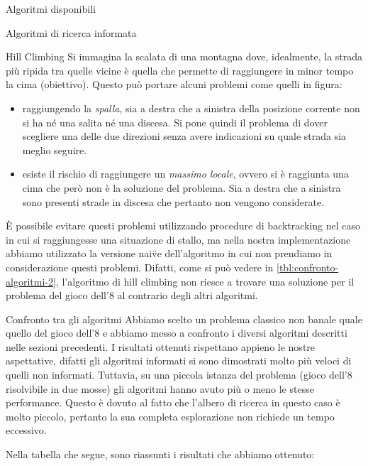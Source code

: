 \begin{chapter}{Algoritmi disponibili}
\begin{section}{Algoritmi di ricerca informata}
\begin{subsection}{Hill Climbing}
    Si immagina la scalata di una montagna dove, idealmente, la strada pi\`u ripida tra quelle vicine
    \`e quella che permette di raggiungere in minor tempo la cima (obiettivo). Questo pu\`o portare
    alcuni problemi come quelli in figura:
    \begin{itemize}
        \item raggiungendo la \textit{spalla}, sia a destra che a sinistra della posizione corrente
        non si ha n\'e una salita n\'e una discesa. Si pone quindi il problema di dover scegliere
        una delle due direzioni senza avere indicazioni su quale strada sia meglio seguire.
        \item esiste il rischio di raggiungere un \textit{massimo locale}, ovvero si \`e raggiunta
        una cima che per\`o non \`e la soluzione del problema. Sia a destra che a sinistra sono
        presenti strade in discesa che pertanto non vengono considerate.
    \end{itemize}

    \`E possibile evitare questi problemi utilizzando procedure di backtracking nel caso in cui si
    raggiungesse una situazione di stallo, ma nella nostra implementazione abbiamo utilizzato la
    versione nai\"ve dell'algoritmo in cui non prendiamo in considerazione questi problemi. Difatti,
    come si pu\`o vedere in \ref{tbl:confronto-algoritmi-2}, l'algoritmo di hill climbing non
    riesce a trovare una soluzione per il problema del gioco dell'8 al contrario degli altri
    algoritmi.
    \end{subsection}
\end{section}

\begin{section}{Confronto tra gli algoritmi}
Abbiamo scelto un problema classico non banale quale quello del gioco dell'8
e abbiamo messo a confronto i diversi algoritmi descritti nelle sezioni
precedenti. I risultati ottenuti rispettano appieno le nostre aspettative,
difatti gli algoritmi informati si sono dimostrati molto pi\`u veloci di
quelli non informati. Tuttavia, su una piccola istanza del problema (gioco
dell'8 risolvibile in due mosse) gli algoritmi hanno avuto pi\`u o meno
le stesse performance. Questo \`e dovuto al fatto che l'albero di ricerca
in questo caso \`e molto piccolo, pertanto la sua completa esplorazione non
richiede un tempo eccessivo.

\noindent Nella tabella che segue, sono riassunti i risultati che abbiamo ottenuto:

\label{tbl:confronto-algoritmi}


\end{section}
\end{chapter}
